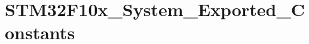 \hypertarget{group___s_t_m32_f10x___system___exported___constants}{}\section{S\+T\+M32\+F10x\+\_\+\+System\+\_\+\+Exported\+\_\+\+Constants}
\label{group___s_t_m32_f10x___system___exported___constants}
